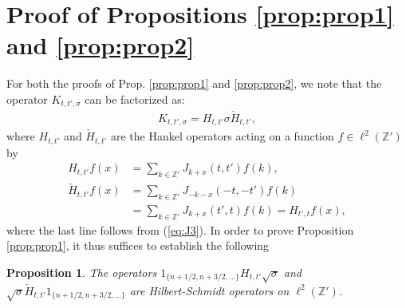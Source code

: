 \documentclass[12pt]{amsart}
\newtheorem{prop}[thm]{Proposition}
\theoremstyle{definition}
\newcommand{\Z}{\mathbb{Z}}
\begin{document}
\section{Proof of Propositions \ref{prop:prop1} and \ref{prop:prop2}} \label{sec:proofofprops}
For both the proofs of Prop. \ref{prop:prop1} and \ref{prop:prop2}, we note that the operator $K_{t,t',\sigma}$ can be factorized as:
\begin{align} \label{eq:factorKsigma}
    K_{t,t',\sigma} = H_{t,t'}\sigma \check{H}_{t,t'},
\end{align}
where $H_{t,t'}$ and $\check{H}_{t,t'}$ are the Hankel operators acting on a function $f \in \ell^2(\Z')$ by
\begin{align*}
H_{t,t'} f (x) &= \sum_{ k \in \Z'} J_{k+x}(t,t') f(k), \\
\check{H}_{t,t'} f(x) &= \sum_{k \in \Z'} J_{-k - x} (-t,-t') f(k) \\
&=\sum_{k \in \Z'}J_{k+x}(t',t)f(k)= H_{t',t}f(x),
\end{align*}
where the last line follows from (\ref{eq:J3}). In order to prove Proposition \ref{prop:prop1}, it thus suffices to establish the following
\begin{prop} \label{prop:hilbertschmidt}
    The operators $\mathfrak{1}_{\{n+1/2,n+3/2,\dots\}}H_{t,t'}\sqrt{\sigma}$ and $\sqrt{\sigma}\check{H}_{t,t'} \mathfrak{1}_{\{n+1/2, n + 3/2, \dots\}}$ are Hilbert-Schmidt operators on $\ell^2(\Z')$.
\end{prop}
\end{document}
